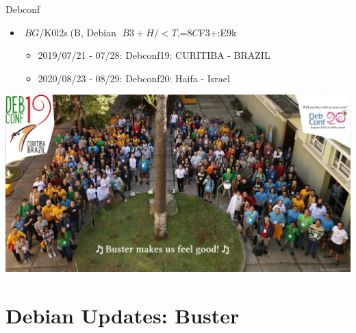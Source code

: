 \documentclass[cjk,c,squeeze,shrink,dvipdfmx,12pt]{beamer}
\begin{document}
\begin{frame}[fragile]{Debconf}
  \begin{itemize}
  \item $BG/$K0l2s(B, Debian $B3+H/<T$,=8$C$F3+:E$9$k%
    \begin{itemize}
      \item 2019/07/21 - 07/28: Debconf19: CURITIBA - BRAZIL
      \item 2020/08/23 - 08/29: Debconf20: Haifa - Israel
    \end{itemize}
  \end{itemize}
  \begin{center}
     \includegraphics[scale=0.2]{image201911-kansai/debconf19_group_small.jpg}
  \end{center}
\end{frame}


\section{Debian Updates: Buster}

{%
  \begin{frame}
    \centering
  \end{frame}
}

\end{document}
